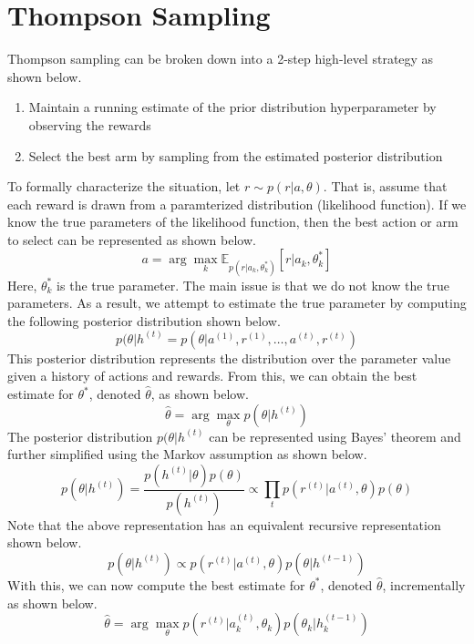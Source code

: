 \documentclass[11pt]{article}
\begin{document}
\section{Thompson Sampling}
Thompson sampling can be broken down into a 2-step high-level strategy as shown below.
\begin{enumerate}
    \item Maintain a running estimate of the prior distribution hyperparameter by observing the rewards
    \item Select the best arm by sampling from the estimated posterior distribution
\end{enumerate}
To formally characterize the situation, let $r \sim p(r|a,\theta)$. That is, assume that each reward is drawn from a paramterized distribution (likelihood function). If we know the true parameters of the likelihood function, then the best action or arm to select can be represented as shown below.
\[ a = \arg\max_k \mathbb{E}_{p(r|a_k,\theta^*_k)}[r|a_k,\theta^*_k] \]
Here, $\theta_k^*$ is the true parameter. The main issue is that we do not know the true parameters. As a result, we attempt to estimate the true parameter by computing the following posterior distribution shown below.
\[ p(\theta|h^{(t)} = p(\theta|a^{(1)}, r^{(1)}, \ldots, a^{(t)}, r^{(t)}) \]
This posterior distribution represents the distribution over the parameter value given a history of actions and rewards. From this, we can obtain the best estimate for $\theta^*$, denoted $\hat{\theta}$, as shown below.
\[ \hat{\theta} = \arg\max_\theta p(\theta|h^{(t)}) \]
The posterior distribution $ p(\theta|h^{(t)}$ can be represented using Bayes' theorem and further simplified using the Markov assumption as shown below.
\[  p(\theta|h^{(t)}) = \frac{p(h^{(t)}|\theta)p(\theta)}{p(h^{(t)})} \propto \prod_t p(r^{(t)}|a^{(t)},\theta)p(\theta) \]
Note that the above representation has an equivalent recursive representation shown below.
\[ p(\theta|h^{(t)}) \propto p(r^{(t)}|a^{(t)},\theta)p(\theta|h^{(t-1)}) \]
With this, we can now compute the best estimate for $\theta^*$, denoted $\hat{\theta}$, incrementally as shown below.
\[ \hat{\theta} = \arg\max_\theta p(r^{(t)}|a_k^{(t)},\theta_k)p(\theta_k|h_k^{(t-1)}) \]
\end{document}
